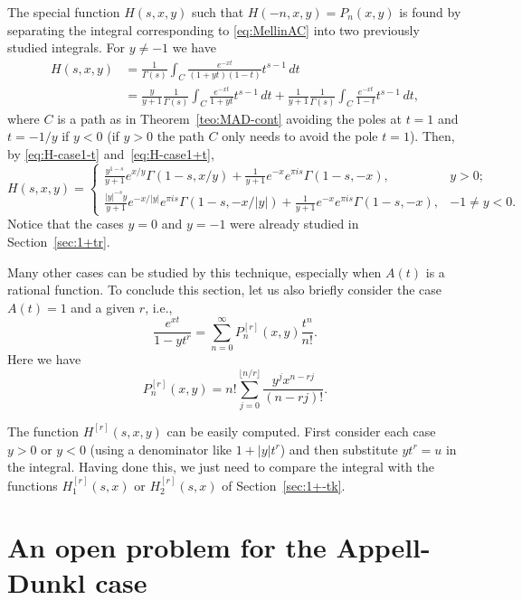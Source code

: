 \documentclass[11pt,a4paper]{amsart}
\theoremstyle{plain}
\theoremstyle{plain}
\theoremstyle{remark}
\numberwithin{equation}{section}
\begin{document}
The special function $H(s,x,y)$ such that $H(-n,x,y) = P_n(x,y)$ is found by separating the integral corresponding to \eqref{eq:MellinAC} into two previously studied integrals. For $y \ne -1$ we have
\begin{align*}
  H(s,x,y) &= \frac{1}{\Gamma(s)} \int_{C} \frac{e^{-xt}}{(1+yt)(1-t)} t^{s-1}\,dt \\
  & = \frac{y}{y+1} \frac{1}{\Gamma(s)} \int_{C} \frac{e^{-xt}}{1+yt} t^{s-1}\,dt 
  + \frac{1}{y+1} \frac{1}{\Gamma(s)} \int_{C} \frac{e^{-xt}}{1-t} t^{s-1}\,dt ,
\end{align*}
where $C$ is a path as in Theorem~\ref{teo:MAD-cont} avoiding the poles at $t=1$ and $t=-1/y$ if $y<0$ (if $y>0$ the path $C$ only needs to avoid the pole $t=1$).
Then, by \eqref{eq:H-case1-t} and~\eqref{eq:H-case1+t},
\begin{equation*}
  H(s,x,y) = 
\begin{cases}
  \frac{y^{1-s}}{y+1} e^{x/y} \Gamma(1-s,x/y) 
  + \frac{1}{y+1} e^{-x}e^{\pi i s} \Gamma(1-s,-x), & y>0; \\[6pt]
  \frac{|y|^{-s}y}{y+1} e^{-x/|y|}e^{\pi i s} \Gamma(1-s,-x/|y|) 
  + \frac{1}{y+1} e^{-x}e^{\pi i s} \Gamma(1-s,-x), & -1\neq y<0.
\end{cases}
\end{equation*}
Notice that the cases $y=0$ and $y=-1$ were already studied in Section~\ref{sec:1+tr}.

Many other cases can be studied by this technique, especially when $A(t)$ is a rational function. To conclude this section, let us also briefly consider the case $A(t)=1$ and a given $r$, i.e.,
\[
  \frac{e^{xt}}{1-yt^r} = \sum_{n=0}^{\infty} P_n^{[r]}(x,y) \frac{t^n}{n!}.
\]
Here we have
\[
  P_n^{[r]}(x,y) = n! \sum_{j=0}^{\lfloor {n}/{r} \rfloor} \frac{y^j x^{n-rj}}{(n-rj)!}.
\]

The function $H^{[r]}(s,x,y)$ can be easily computed. First consider each case $y>0$ or $y<0$ (using a denominator like $1+|y|t^r$) and then substitute $yt^r = u$ in the integral. Having done this, we just need to compare the integral with the functions $H_1^{[r]}(s,x)$ or $H_2^{[r]}(s,x)$ of Section~\ref{sec:1+-tk}. 

\section{An open problem for the Appell-Dunkl case}
\label{sec:dunkl}
\end{document}
